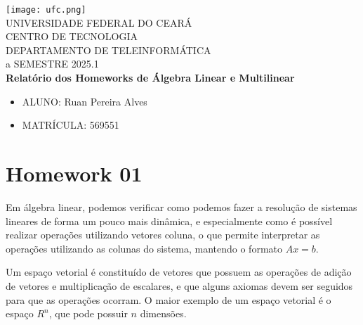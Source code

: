 



\clearpage
\thispagestyle{empty}

\begin{bfseries}
\begin{center}

\texttt{[image: ufc.png]} \\
\vspace{-4pt} 
UNIVERSIDADE FEDERAL DO CEARÁ \\
\vspace{4pt} 
CENTRO DE TECNOLOGIA \\
\vspace{4pt} 
DEPARTAMENTO DE TELEINFORMÁTICA \\
\vspace{4pt}
a
\vspace{4pt}
SEMESTRE 2025.1 \\


\vspace*{\fill}
\textbf{Relatório dos Homeworks de Álgebra Linear e Multilinear}
\vspace*{\fill}

\end{center}

\begin{itemize}[leftmargin=*]
    \setlength{\itemsep}{0pt}
    \item[] ALUNO: Ruan Pereira Alves
    \item[] MATRÍCULA: 569551
\end{itemize}

\end{bfseries}
\newpage

\section{Homework 01}

Em álgebra linear, podemos verificar como podemos fazer a resolução de sistemas lineares de forma um pouco mais dinâmica, e especialmente como é possível realizar operações utilizando vetores coluna, o que permite interpretar as operações utilizando as colunas do sistema, mantendo o formato $Ax = b$. 

Um espaço vetorial é constituído de vetores que possuem as operações de adição de vetores e multiplicação de escalares, e que alguns axiomas devem ser seguidos para que as operações ocorram. O maior exemplo de um espaço vetorial é o espaço $R^n$, que pode possuir $n$ dimensões.

